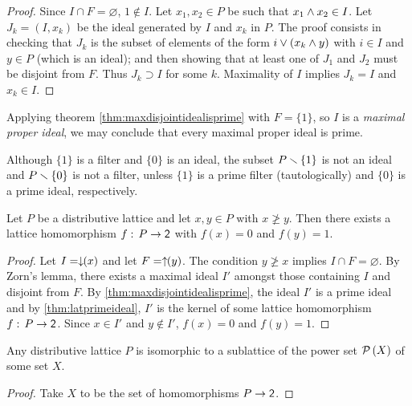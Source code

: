 \begin{proof}
	Since $I\cap F=\varnothing$, $1\not\in I$. Let $x_{1},x_{2}\in P$ be
	such that $x_{1}\wedge x_{2}\in I$. Let $J_{k}=(I,x_{k})$ be the
	ideal generated by $I$ and $x_{k}$ in $P$. The proof consists in
	checking that $J_{k}$ is the subset of elements of the form
	$i\vee(x_{k}\wedge y)$ with $i\in I$ and $y\in P$
	(which is an ideal); and then showing that at least one of $J_{1}$
	and $J_{2}$ must be disjoint from $F$. Thus $J_{k}\supset I$ for some
	$k$. Maximality of $I$ implies $J_{k}=I$ and $x_{k}\in I$.
\end{proof}

Applying theorem \ref{thm:maxdisjointidealisprime} with $F=\{1\}$, so
$I$ is a \emph{maximal proper ideal}, we may conclude that every maximal
proper ideal is prime.

\begin{remarkNotAnIdeal}
	Although $\{1\}$ is a filter and $\{0\}$ is an ideal, the subset
	$P\smallsetminus\{1\}$ is not an ideal and $P\smallsetminus\{0\}$ is not a filter,
	unless $\{1\}$ is a prime filter (tautologically) and $\{0\}$ is a
	prime ideal, respectively.
\end{remarkNotAnIdeal}

\begin{thmSeparation}\label{thm:separation}
	Let $P$ be a distributive lattice and let $x,y\in P$ with
	$x\not\geq y$. Then there exists a lattice homomorphism
	$f:\,P\rightarrow\mathsf{2}$ with $f(x)=0$ and $f(y)=1$.
\end{thmSeparation}

\begin{proof}
	Let $I=\downarrow\!\!(x)$ and let $F=\uparrow\!\!(y)$. The condition
	$y\not\geq x$ implies $I\cap F=\varnothing$. By Zorn's lemma,
	there exists a maximal ideal $I'$ amongst those containing $I$
	and disjoint from $F$. By \ref{thm:maxdisjointidealisprime},
	the ideal $I'$ is a prime ideal and by \ref{thm:latprimeideal},
	$I'$ is the kernel of some lattice homomorphism
	$f:\,P\rightarrow\mathsf{2}$. Since $x\in I'$ and $y\not\in I'$,
	$f(x)=0$ and $f(y)=1$.
\end{proof}

\begin{coroDistLatIsConcrete}\label{thm:distlatisconcrete}
	Any distributive lattice $P$ is isomorphic to a sublattice
	of the power set $\mathcal{P}\left(X\right)$ of some set $X$.
\end{coroDistLatIsConcrete}

\begin{proof}
	Take $X$ to be the set of homomorphisms $P\rightarrow\mathsf{2}$.
\end{proof}

